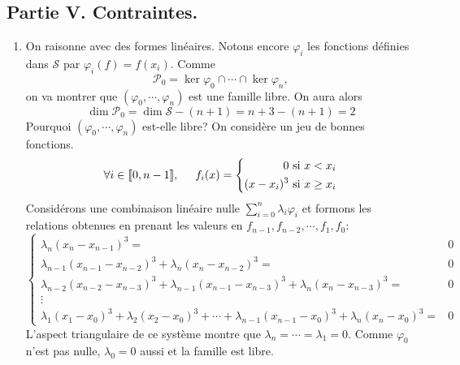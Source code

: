 \subsection*{Partie V. Contraintes.}
\begin{enumerate}
  \item On raisonne avec des formes linéaires. Notons encore $\varphi_i$ les fonctions définies dans $\mathcal{S}$ par $\varphi_i(f)=f(x_i)$. Comme 
\begin{displaymath}
  \mathcal{P}_0 = \ker\varphi_0 \cap \cdots \cap \ker \varphi_n,
\end{displaymath}
on va montrer que $\left( \varphi_0, \cdots , \varphi_n\right)$ est une famille libre. On aura alors 
\begin{displaymath}
  \dim \mathcal{P}_0 = \dim \mathcal{S} -(n+1) = n+3 -(n+1) = 2
\end{displaymath}
Pourquoi $\left( \varphi_0, \cdots , \varphi_n\right)$ est-elle libre?\newline
On considère un jeu de bonnes fonctions.
\begin{displaymath}
\forall i \in \llbracket 0, n-1\rrbracket, \hspace{0.5cm} f_i(x)=
\left\lbrace 
\begin{aligned}
  0 \text{ si }& x< x_i \\ (x-x_i)^3 \text{ si }& x\geq x_i
\end{aligned}
\right. 
\end{displaymath}
Considérons une combinaison linéaire nulle $\sum_{i=0}^{n}\lambda_i\varphi_i$ et formons les relations obtenues en prenant les valeurs en $f_{n-1},f_{n-2},\cdots ,f_1, f_0$:
\begin{displaymath}
\left\lbrace  
\begin{aligned}
  \lambda_n(x_{n}-x_{n-1})^3 =& 0 \\
  \lambda_{n-1}(x_{n-1}-x_{n-2})^3 + \lambda_n(x_{n}-x_{n-2})^3 =& 0 \\
  \lambda_{n-2}(x_{n-2}-x_{n-3})^3 + \lambda_{n-1}(x_{n-1}-x_{n-3})^3 + \lambda_n(x_{n}-x_{n-3})^3 =& 0\\
  \vdots& \\
  \lambda_{1}(x_{1}-x_{0})^3 + \lambda_{2}(x_{2}-x_{0})^3 + \cdots + \lambda_{n-1}(x_{n-1}-x_{0})^3 + \lambda_n(x_{n}-x_{0})^3 =& 0
\end{aligned}
\right. 
\end{displaymath}
L'aspect triangulaire de ce système montre que $\lambda_n = \cdots = \lambda_1=0$. Comme $\varphi_0$ n'est pas nulle, $\lambda_0=0$ aussi et la famille est libre.


\end{enumerate}
